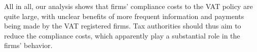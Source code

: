 
All in all, our analysis shows that firms' compliance costs to the VAT policy are quite large, with unclear benefits of more frequent information and payments being made by the VAT registered firms. Tax authorities should thus aim to reduce the compliance costs, which apparently play a substantial role in the firms' behavior. 